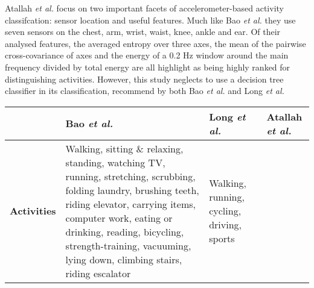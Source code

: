     Atallah \emph{et al.} \cite{atallah2010sensor} focus on two important facets of accelerometer-based activity classifcation: sensor location and useful features. Much like Bao \emph{et al.} they use seven sensors on the chest, arm, wrist, waist, knee, ankle and ear. Of their analysed features, the averaged entropy over three axes, the mean of the pairwise cross-covariance of axes and the energy of a 0.2 Hz window around the main frequency divided by total energy are all highlight as being highly ranked for distinguishing activities. However, this study neglects to use a decision tree classifier in its classification, recommend by both Bao \emph{et al.} and Long \emph{et al.}
    \begin{table}[p]
      {\tabulinesep=1.2mm
      \begin{tabu} to 
        \hline
          & \textbf{Bao \emph{et al.} \cite{bao2004activity}}
          & \textbf{Long \emph{et al.} \cite{long2009single}}
          & \textbf{Atallah \emph{et al.} \cite{atallah2010sensor}} \\
        \hline
          \textbf{Activities}
          & Walking, \newline sitting \& relaxing, \newline standing, \newline watching TV,
              \newline running, \newline stretching, \newline scrubbing, \newline folding laundry, 
              \newline brushing teeth, \newline riding elevator, \newline carrying items, 
              \newline computer work, \newline eating or drinking, \newline reading, 
              \newline bicycling, \newline strength-training, \newline vacuuming, 
              \newline lying down, \newline climbing stairs, \newline riding escalator
          & Walking, \newline running, \newline cycling, \newline driving, \newline sports

\end{tabu}}
\end{table}
